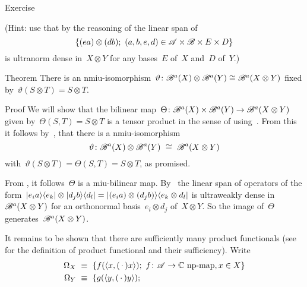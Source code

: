 \documentclass[b]{subfiles}
\begin{document}
\begin{parsec}
\begin{point}{Exercise}
\begin{enumerate}
    (Hint:
    use that by the reasoning of 
    the linear
    span of
    \begin{equation*}
    \{ (e a) \otimes (d b); \ (a,b,e,d) \in \mathscr{A} \times \mathscr{B}
                    \times E \times D\}
    \end{equation*}
        is ultranorm dense in~$X \otimes Y$
        for any bases~$E$ of~$X$ and~$D$ of~$Y$.)

\end{enumerate}
\end{point}
\begin{point}{Theorem}%
There is an
    nmiu-isomorphism~$\vartheta\colon \mathscr{B}^a(X) \otimes \mathscr{B}^a(Y) \cong \mathscr{B}^a(X \otimes Y)$
    fixed by~$\vartheta(S\otimes T) = S \otimes T$.
\begin{point}{Proof}%
We will show that
    the bilinear map~$\Theta \colon 
            \mathscr{B}^a(X) \times \mathscr{B}^a(Y) \to
    \mathscr{B}^a(X \otimes Y)$
    given by~$\Theta(S,T) = S \otimes T$
    is a tensor product in the sense of 
    using~.
From this it follows
    by~,
    that there is a
    nmiu-isomorphism
    \begin{equation*}
    \vartheta\colon \scrB^a(X) \otimes \scrB^a(Y) \ \cong\  \scrB^a(X \otimes Y)
    \end{equation*}
    with~$\vartheta(S\otimes T) = \Theta(S , T) = S \otimes T$, as promised.
\begin{point}%
From , it follows~$\Theta$ is a miu-bilinear map.
By~
    the linear span of operators of the form~$
        \left|e_i a\right>\!\left<e_k\right| \otimes \left|d_j b \right>\!\left<d_l\right|
        = \left|(e_i a) \otimes (d_j b)\right>\!\left<e_k \otimes d_l\right| $
        is ultraweakly dense in~$\mathscr{B}^a(X \otimes Y)$
        for an orthonormal basis~$e_i \otimes d_j$ of~$X \otimes Y$.
        So the image of~$\Theta$ generates~$\mathscr{B}^a(X\otimes Y)$.
\begin{point}%
    It remains to be shown that there are sufficiently many product functionals
    (see~ for the definition of product functional
    and their sufficiency).
    Write
    \begin{align*}
        \Omega_X &\ \equiv \ 
                    \{ f(\langle x, (\,\cdot\,) x \rangle);
                    \ f \colon \scrA \to \C \text{ np-map}, x\in X \} \\
        \Omega_Y& \  \equiv\ 
                    \{ g(\langle y, (\,\cdot\,) y \rangle);

\end{align*}
\end{point}
\end{point}
\end{point}
\end{point}
\end{parsec}
\end{document}
